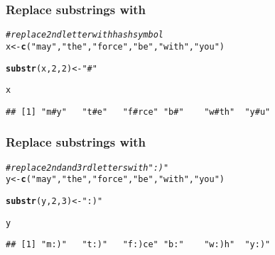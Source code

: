 \documentclass[12pt]{beamer}\usepackage[]{graphicx}\usepackage[]{color}
\makeatletter
\newcommand{\hlnum}[1]{\textcolor[rgb]{0.686,0.059,0.569}{#1}}%
\newcommand{\hlstr}[1]{\textcolor[rgb]{0.192,0.494,0.8}{#1}}%
\newcommand{\hlcom}[1]{\textcolor[rgb]{0.678,0.584,0.686}{\textit{#1}}}%
\newcommand{\hlstd}[1]{\textcolor[rgb]{0.345,0.345,0.345}{#1}}%
\newcommand{\hlkwb}[1]{\textcolor[rgb]{0.69,0.353,0.396}{#1}}%
\newcommand{\hlkwd}[1]{\textcolor[rgb]{0.737,0.353,0.396}{\textbf{#1}}}%
\newenvironment{kframe}{%
 \def\at@end@of@kframe{}%
 \ifinner\ifhmode%
  \def\at@end@of@kframe{\end{minipage}}%
  \begin{minipage}{\columnwidth}%
 \fi\fi%
 \def\FrameCommand##1{\hskip\@totalleftmargin \hskip-\fboxsep
 \colorbox{shadecolor}{##1}\hskip-\fboxsep
     \hskip-\linewidth \hskip-\@totalleftmargin \hskip\columnwidth}%
 \MakeFramed {\advance\hsize-\width
   \@totalleftmargin\z@ \linewidth\hsize
   \@setminipage}}%
 {\par\unskip\endMakeFramed%
 \at@end@of@kframe}
\newenvironment{knitrout}{}{} %
\makeatother
\begin{document}
\begin{frame}[fragile]
\frametitle{Replace substrings with }

\begin{knitrout}\footnotesize
{}\color{fgcolor}\begin{kframe}
\begin{alltt}
\hlcom{# replace 2nd letter with hash symbol}
\hlstd{x} \hlkwb{<-} \hlkwd{c}\hlstd{(}\hlstr{"may"}\hlstd{,} \hlstr{"the"}\hlstd{,} \hlstr{"force"}\hlstd{,} \hlstr{"be"}\hlstd{,} \hlstr{"with"}\hlstd{,} \hlstr{"you"}\hlstd{)}

\hlkwd{substr}\hlstd{(x,} \hlnum{2}\hlstd{,} \hlnum{2}\hlstd{)} \hlkwb{<-} \hlstr{"#"}

\hlstd{x}
\end{alltt}
\begin{verbatim}
## [1] "m#y"   "t#e"   "f#rce" "b#"    "w#th"  "y#u"
\end{verbatim}
\end{kframe}
\end{knitrout}

\end{frame}


\begin{frame}[fragile]
\frametitle{Replace substrings with }

\begin{knitrout}\footnotesize
{}\color{fgcolor}\begin{kframe}
\begin{alltt}
\hlcom{# replace 2nd and 3rd letters with ":)"}
\hlstd{y} \hlkwb{<-} \hlkwd{c}\hlstd{(}\hlstr{"may"}\hlstd{,} \hlstr{"the"}\hlstd{,} \hlstr{"force"}\hlstd{,} \hlstr{"be"}\hlstd{,} \hlstr{"with"}\hlstd{,} \hlstr{"you"}\hlstd{)}

\hlkwd{substr}\hlstd{(y,} \hlnum{2}\hlstd{,} \hlnum{3}\hlstd{)} \hlkwb{<-} \hlstr{":)"}

\hlstd{y}
\end{alltt}
\begin{verbatim}
## [1] "m:)"   "t:)"   "f:)ce" "b:"    "w:)h"  "y:)"
\end{verbatim}
\end{kframe}
\end{knitrout}

\end{frame}
\end{document}
